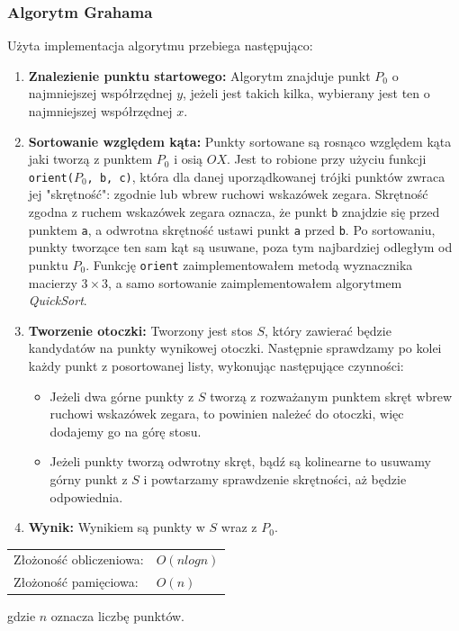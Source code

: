 \documentclass[11pt,a4paper]{article}
\begin{document}
\subsubsection{Algorytm Grahama}
Użyta implementacja algorytmu przebiega następująco:
\begin{enumerate}
    \item \textbf{Znalezienie punktu startowego:}
    Algorytm znajduje punkt $P_0$ o najmniejszej współrzędnej $y$, jeżeli
    jest takich kilka, wybierany jest ten o najmniejszej współrzędnej $x$.
    \item \textbf{Sortowanie względem kąta:}
    Punkty sortowane są rosnąco względem kąta jaki tworzą z punktem $P_0$
    i osią $OX$. Jest to robione przy użyciu funkcji \verb|orient(|$P_0$\verb|, b, c)|,
    która dla danej uporządkowanej trójki punktów zwraca jej "skrętność": 
    zgodnie lub wbrew ruchowi wskazówek zegara. 
    Skrętność zgodna z ruchem wskazówek zegara oznacza, że punkt \verb|b|
    znajdzie się przed punktem \verb|a|, a odwrotna skrętność ustawi
    punkt \verb|a| przed \verb|b|. Po sortowaniu, punkty 
    tworzące ten sam kąt są usuwane, poza tym najbardziej odległym od punktu $P_0$.
    Funkcję \verb|orient| zaimplementowałem metodą wyznacznika 
    macierzy $3\times3$, a samo sortowanie zaimplementowałem algorytmem
    \textit{QuickSort}.
    \item \textbf{Tworzenie otoczki:}
    Tworzony jest stos $S$, który zawierać będzie kandydatów na
    punkty wynikowej otoczki. Następnie sprawdzamy po kolei każdy
    punkt z posortowanej listy, wykonując następujące czynności:
    \begin{itemize}
        \item Jeżeli dwa górne punkty z $S$ tworzą z rozważanym
        punktem skręt wbrew ruchowi wskazówek zegara, to powinien
        należeć do otoczki, więc dodajemy go na górę stosu.
        \item Jeżeli punkty tworzą odwrotny skręt, bądź są kolinearne
        to usuwamy górny punkt z $S$ i powtarzamy sprawdzenie skrętności,
        aż będzie odpowiednia.
    \end{itemize}
    \item \textbf{Wynik:} Wynikiem są punkty w $S$ wraz z $P_0$.
\end{enumerate}

\begin{tabular}{l|l|}
    Złożoność obliczeniowa: & $O(nlogn)$ \\
    Złożoność pamięciowa: & $O(n)$ \\
\end{tabular}
\footnotesize gdzie $n$ oznacza liczbę punktów. \normalsize
\end{document}
